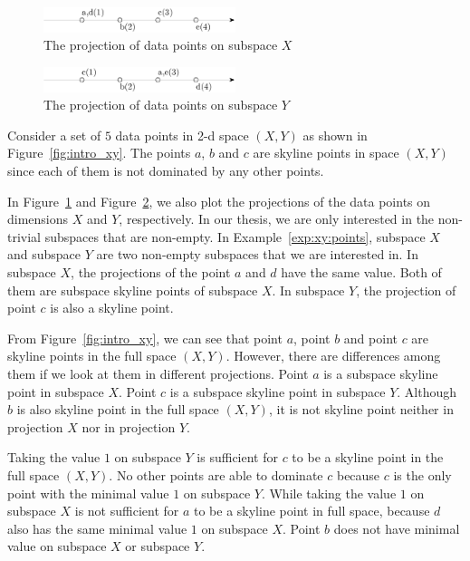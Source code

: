 \begin{figure}[H]
\centering
\includegraphics[width=0.5\textwidth]{figs/intro_x.eps}
\caption{The projection of data points on subspace $X$}
\label{fig:intro_x}
\end{figure}

\begin{figure}[H]
\centering
\includegraphics[width=0.5\textwidth]{figs/intro_y.eps}
\caption{The projection of data points on subspace $Y$}
\label{fig:intro_y}
\end{figure}

\begin{example} 
\label{exp:xy:points}
Consider a set of $5$ data points in 2-d space $(X, Y)$ as shown in Figure~\ref{fig:intro_xy}. The points $a$, $b$ and $c$ are skyline points in space $(X, Y)$ since each of them is not dominated by any other points.
\end{example}

In Figure~\ref{fig:intro_x} and Figure~\ref{fig:intro_y}, we also plot the projections of the data points on dimensions $X$ and $Y$, respectively. In our thesis, we are only interested in the non-trivial subspaces that are non-empty. In Example~\ref{exp:xy:points}, subspace $X$ and subspace $Y$ are two non-empty subspaces that we are interested in. In subspace $X$, the projections of the point $a$ and $d$ have the same value. Both of them are subspace skyline points of subspace $X$. In subspace $Y$, the projection of point $c$ is also a skyline point.

From Figure~\ref{fig:intro_xy}, we can see that point $a$, point $b$ and point $c$ are skyline points in the full space $(X, Y)$. However, there are differences among them if we look at them in different projections. Point $a$ is a subspace skyline point in subspace $X$. Point $c$ is a subspace skyline point in subspace $Y$. Although $b$ is also skyline point in the full space $(X, Y)$, it is not skyline point neither in projection $X$ nor in projection $Y$.

Taking the value $1$ on subspace $Y$ is sufficient for $c$ to be a skyline point in the full space $(X, Y)$. No other points are able to dominate $c$ because $c$ is the only point with the minimal value $1$ on subspace $Y$. While taking the value $1$ on subspace $X$ is not sufficient for $a$ to be a skyline point in full space, because $d$ also has the same minimal value $1$ on subspace $X$. Point $b$ does not have minimal value on subspace $X$ or subspace $Y$.

